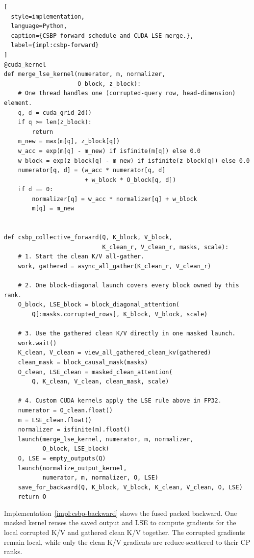 \begin{lstlisting}[
  style=implementation,
  language=Python,
  caption={CSBP forward schedule and CUDA LSE merge.},
  label={impl:csbp-forward}
]
@cuda_kernel
def merge_lse_kernel(numerator, m, normalizer,
                     O_block, z_block):
    # One thread handles one (corrupted-query row, head-dimension) element.
    q, d = cuda_grid_2d()
    if q >= len(z_block):
        return
    m_new = max(m[q], z_block[q])
    w_acc = exp(m[q] - m_new) if isfinite(m[q]) else 0.0
    w_block = exp(z_block[q] - m_new) if isfinite(z_block[q]) else 0.0
    numerator[q, d] = (w_acc * numerator[q, d]
                       + w_block * O_block[q, d])
    if d == 0:
        normalizer[q] = w_acc * normalizer[q] + w_block
        m[q] = m_new


def csbp_collective_forward(Q, K_block, V_block,
                            K_clean_r, V_clean_r, masks, scale):
    # 1. Start the clean K/V all-gather.
    work, gathered = async_all_gather(K_clean_r, V_clean_r)

    # 2. One block-diagonal launch covers every block owned by this rank.
    O_block, LSE_block = block_diagonal_attention(
        Q[:masks.corrupted_rows], K_block, V_block, scale)

    # 3. Use the gathered clean K/V directly in one masked launch.
    work.wait()
    K_clean, V_clean = view_all_gathered_clean_kv(gathered)
    clean_mask = block_causal_mask(masks)
    O_clean, LSE_clean = masked_clean_attention(
        Q, K_clean, V_clean, clean_mask, scale)

    # 4. Custom CUDA kernels apply the LSE rule above in FP32.
    numerator = O_clean.float()
    m = LSE_clean.float()
    normalizer = isfinite(m).float()
    launch(merge_lse_kernel, numerator, m, normalizer,
           O_block, LSE_block)
    O, LSE = empty_outputs(Q)
    launch(normalize_output_kernel,
           numerator, m, normalizer, O, LSE)
    save_for_backward(Q, K_block, V_block, K_clean, V_clean, O, LSE)
    return O
\end{lstlisting}

\clearpage
Implementation~\ref{impl:csbp-backward} shows the fused packed backward. One
masked kernel reuses the saved output and LSE to compute gradients for the local
corrupted K/V and gathered clean K/V together. The corrupted gradients remain
local, while only the clean K/V gradients are reduce-scattered to their CP
ranks.


